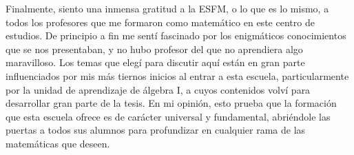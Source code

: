 Finalmente, siento una inmensa gratitud a la ESFM, o lo que es lo mismo, a todos los profesores que me formaron como matemático en este centro de estudios. De principio a fin me sentí fascinado por los enigmáticos conocimientos que se nos presentaban, y no hubo profesor del que no aprendiera algo maravilloso. Los temas que elegí para discutir aquí están en gran parte influenciados por mis más tiernos inicios al entrar a esta escuela, particularmente por la unidad de aprendizaje de álgebra I, a cuyos contenidos volví para desarrollar gran parte de la tesis. En mi opinión, esto prueba que la formación que esta escuela ofrece es de carácter universal y fundamental, abriéndole las puertas a todos sus alumnos para profundizar en cualquier rama de las matemáticas que deseen.
\newpage
\thispagestyle{empty}
\

\newpage
{}
\thispagestyle{plain}
\tableofcontents
\newpage
\thispagestyle{empty}
\












